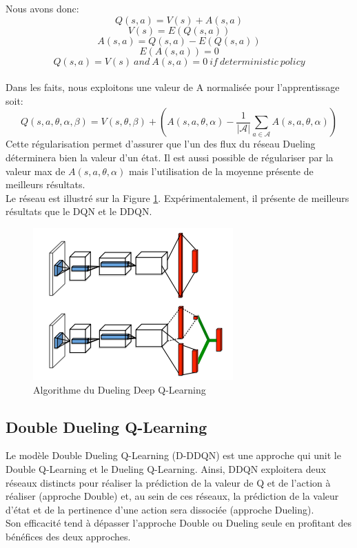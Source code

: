 \noindent Nous avons donc:
$$Q(s,a) = V(s) + A(s,a)$$
$$V(s)=E(Q(s,a))$$
$$A(s,a)=Q(s,a)-E(Q(s,a))$$
$$E(A(s,a))=0$$
$$Q(s,a)=V(s) \ and \ A(s,a)=0 \ if \ deterministic \ policy$$\\

\noindent Dans les faits, nous exploitons une valeur de A normalisée pour l'apprentissage soit:
$$Q(s,a,\theta,\alpha,\beta)=V(s,\theta,\beta)+(A(s,a,\theta,\alpha)-\frac{1}{|\mathcal{A}|}\sum_{a \in \mathcal{A}}A(s,a,\theta, \alpha)) $$
\noindent Cette régularisation permet d'assurer que l'un des flux du réseau Dueling déterminera bien la valeur d'un état. Il est aussi possible de régulariser par la valeur max de $A(s,a,\theta,\alpha)$ mais l'utilisation de la moyenne présente de meilleurs résultats. \\

\noindent Le réseau est illustré sur la Figure \ref{dudeepql}. Expérimentalement, il présente de meilleurs résultats que le DQN et le DDQN.
\begin{figure}
    \centering
    \includegraphics[scale=0.4]{./tex/reinforcement-learning/duelingdeepq.png}
    \caption{Algorithme du Dueling Deep Q-Learning}
    \label{dudeepql}
\end{figure}


\subsection{Double Dueling Q-Learning}
Le modèle Double Dueling Q-Learning (D-DDQN) est une approche qui unit le Double Q-Learning et le Dueling Q-Learning. Ainsi, DDQN exploitera deux réseaux distincts pour réaliser la prédiction de la valeur de Q et de l'action à réaliser (approche Double) et, au sein de ces réseaux, la prédiction de la valeur d'état et de la pertinence d'une action sera dissociée (approche Dueling).\\

\noindent Son efficacité tend à dépasser l'approche Double ou Dueling seule en profitant des bénéfices des deux approches.
